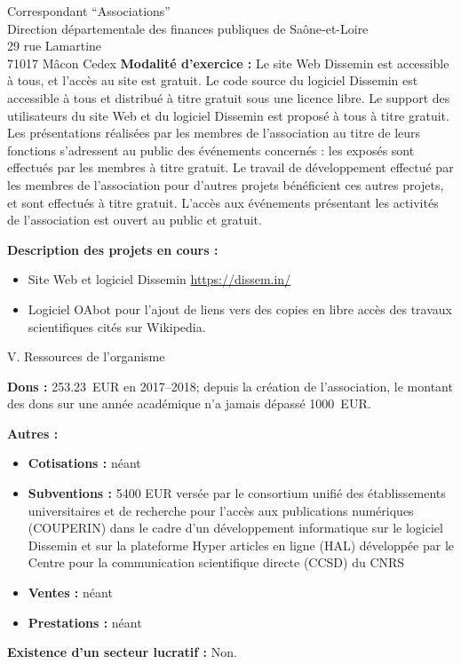 \documentclass[11pt]{lettre}
\begin{document}
\begin{letter}{Correspondant ``Associations''\\Direction départementale des finances publiques de Saône-et-Loire\\29 rue Lamartine\\71017 Mâcon Cedex}
  \textbf{Modalité d'exercice :} Le site Web Dissemin est accessible à tous, et
  l'accès au site est gratuit. Le code source du logiciel Dissemin est
  accessible à tous et distribué à titre gratuit sous une licence libre. Le
  support des utilisateurs du site Web et du logiciel Dissemin est proposé à
  tous à titre gratuit. Les présentations réalisées par les membres de
  l'association au titre de leurs fonctions s'adressent au public des événements
  concernés : les exposés sont effectués par les membres à titre gratuit. Le
  travail de développement effectué par les membres de l'association pour
  d'autres projets bénéficient ces autres projets, et sont effectués à titre
  gratuit. L'accès aux événements présentant les activités de l'association est
  ouvert au public et gratuit.

  \textbf{Description des projets en cours :}

  \begin{itemize}
    \item Site Web et logiciel Dissemin \url{https://dissem.in/}
    \item Logiciel OAbot pour l'ajout de liens vers des copies en libre accès
      des travaux scientifiques cités sur Wikipedia.
  \end{itemize}

  \bigskip
  {\Large V. Ressources de l'organisme}

  \textbf{Dons :} 253.23~EUR en 2017--2018; depuis la création de l'association,
  le montant des dons sur une année académique n'a jamais dépassé 1000~EUR.

  \textbf{Autres :}

  \begin{itemize}
    \item \textbf{Cotisations :} néant
    \item \textbf{Subventions :} 5400 EUR versée par le consortium unifié des
      établissements universitaires et de recherche pour l'accès aux
      publications numériques (COUPERIN) dans le cadre d'un développement
      informatique sur le logiciel Dissemin et sur la plateforme Hyper articles
          en ligne (HAL) développée par le Centre pour la communication
          scientifique directe (CCSD) du CNRS
    \item \textbf{Ventes :} néant
    \item \textbf{Prestations :} néant
  \end{itemize}

  \textbf{Existence d'un secteur lucratif :} Non.


\end{letter}
\end{document}

